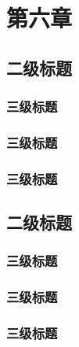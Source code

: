 \chapter{第六章}

\section{二级标题}

\subsection{三级标题}

\subsection{三级标题}

\subsection{三级标题}

\section{二级标题}

\subsection{三级标题}

\subsection{三级标题}

\subsection{三级标题}